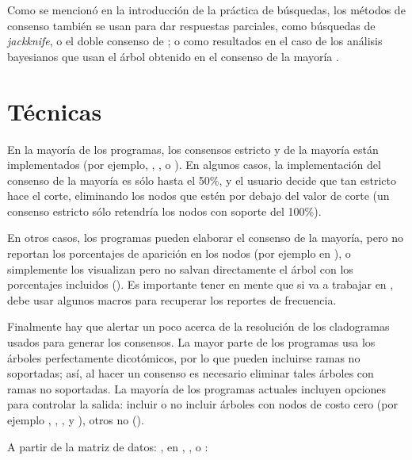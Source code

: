 Como se mencion\'o en la introducci\'on de la pr\'actica de b\'usquedas, los m\'etodos de consenso tambi\'en se  usan para dar respuestas parciales, como b\'usquedas de \textit{jackknife}, o el doble consenso de \cite{GoloboffFarris2001}; o como resultados en el caso de los an\'alisis bayesianos que usan el \'arbol obtenido en el consenso de la mayor\'ia \citep{HuelsenbeckRonquist2001}.


\section*{T\'ecnicas}
En la mayor\'ia de los programas, los consensos estricto y de la mayor\'ia est\'an implementados (por ejemplo, , ,  o ). En algunos casos, la implementaci\'on del consenso de la mayor\'ia es s\'olo hasta el 50\%, y el usuario decide que tan estricto hace el corte, eliminando los nodos que est\'en por debajo del valor de corte (un consenso estricto s\'olo retendr\'ia los nodos con soporte del 100\%).

En otros casos, los programas pueden elaborar el consenso de la mayor\'ia, pero no reportan los porcentajes de aparici\'on en los nodos (por ejemplo en ), o simplemente los visualizan pero no salvan directamente el \'arbol con los porcentajes incluidos (). Es importante tener en mente que si va a trabajar en , debe usar algunos macros para recuperar los reportes de frecuencia.

Finalmente hay que alertar un poco acerca de la resoluci\'on de los cladogramas usados para generar los consensos. La mayor parte de los programas usa los \'arboles perfectamente dicot\'omicos, por lo que pueden incluirse ramas no soportadas; as\'i, al hacer un consenso es necesario eliminar tales \'arboles con ramas no soportadas. La mayor\'ia de los programas actuales incluyen opciones para controlar la salida: incluir o no incluir \'arboles con nodos de costo cero (por ejemplo , , ,  y ), otros no ().




A partir de la matriz de datos: , 
en , ,  o :

